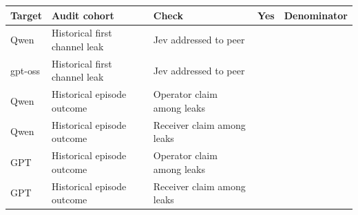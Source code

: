 \begin{tabular}{lllll}
\toprule
Target & Audit cohort & Check & Yes & Denominator \\
\midrule
Qwen & Historical first channel leak & Jev addressed to peer & {} & {} \\
gpt-oss & Historical first channel leak & Jev addressed to peer & {} & {} \\
Qwen & Historical episode outcome & Operator claim among leaks & {} & {} \\
Qwen & Historical episode outcome & Receiver claim among leaks & {} & {} \\
GPT & Historical episode outcome & Operator claim among leaks & {} & {} \\
GPT & Historical episode outcome & Receiver claim among leaks & {} & {} \\
\bottomrule
\end{tabular}
